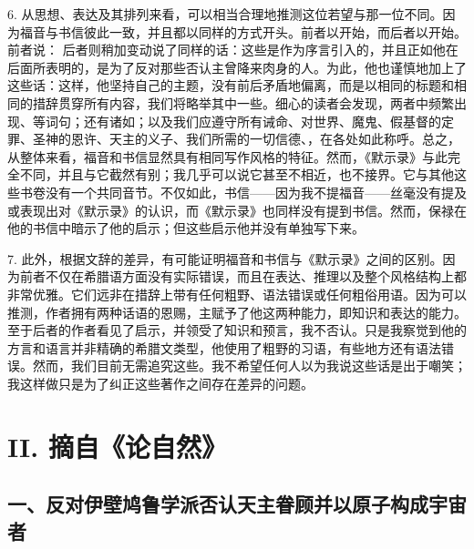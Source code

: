 6. 从思想、表达及其排列来看，可以相当合理地推测这位若望与那一位不同。因为福音与书信彼此一致，并且都以同样的方式开头。前者以开始，而后者以开始。前者说： 后者则稍加变动说了同样的话：这些是作为序言引入的，并且正如他在后面所表明的，是为了反对那些否认主曾降来肉身的人。为此，他也谨慎地加上了这些话：这样，他坚持自己的主题，没有前后矛盾地偏离，而是以相同的标题和相同的措辞贯穿所有内容，我们将略举其中一些。细心的读者会发现，两者中频繁出现、等词句；还有诸如；以及我们应遵守所有诫命、对世界、魔鬼、假基督的定罪、圣神的恩许、天主的义子、我们所需的一切信德、，在各处如此称呼。总之，从整体来看，福音和书信显然具有相同写作风格的特征。然而，《默示录》与此完全不同，并且与它截然有别；我几乎可以说它甚至不相近，也不接界。它与其他这些书卷没有一个共同音节。不仅如此，书信——因为我不提福音——丝毫没有提及或表现出对《默示录》的认识，而《默示录》也同样没有提到书信。然而，保禄在他的书信中暗示了他的启示；但这些启示他并没有单独写下来。\par

7. 此外，根据文辞的差异，有可能证明福音和书信与《默示录》之间的区别。因为前者不仅在希腊语方面没有实际错误，而且在表达、推理以及整个风格结构上都非常优雅。它们远非在措辞上带有任何粗野、语法错误或任何粗俗用语。因为可以推测，作者拥有两种话语的恩赐，主赋予了他这两种能力，即知识和表达的能力。至于后者的作者看见了启示，并领受了知识和预言，我不否认。只是我察觉到他的方言和语言并非精确的希腊文类型，他使用了粗野的习语，有些地方还有语法错误。然而，我们目前无需追究这些。我不希望任何人以为我说这些话是出于嘲笑；我这样做只是为了纠正这些著作之间存在差异的问题。\par


\section{II. 摘自《论自然》}


\subsection{一、反对伊壁鸠鲁学派否认天主眷顾并以原子构成宇宙者}

